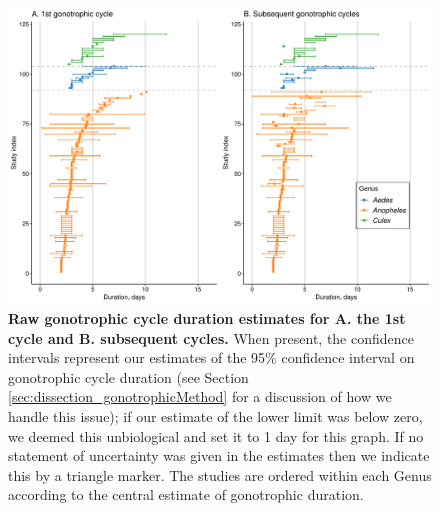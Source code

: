 \documentclass[12pt]{article}
\begin{document}
\begin{figure}[ht]
	\centerline{\includegraphics[width=1\textwidth]{./Figure_files/gonotrophic_data.pdf}}
	\caption{\textbf{Raw gonotrophic cycle duration estimates for A. the 1st cycle and B. subsequent cycles.} When present, the confidence intervals represent our estimates of the 95\% confidence interval on gonotrophic cycle duration (see Section \ref{sec:dissection_gonotrophicMethod} for a discussion of how we handle this issue); if our estimate of the lower limit was below zero, we deemed this unbiological and set it to 1 day for this graph. If no statement of uncertainty was given in the estimates then we indicate this by a triangle marker. The studies are ordered within each Genus according to the central estimate of gonotrophic duration.}\label{fig:dissection_gonotrophicCycleRaw}
\end{figure}
\end{document}
